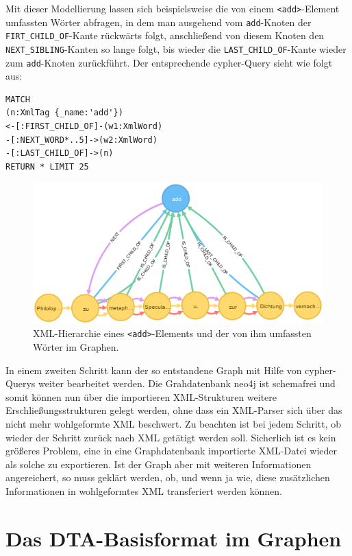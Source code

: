 \documentclass[ngerman,]{scrreprt}
\begin{document}
Mit dieser Modellierung lassen sich beispielsweise die von einem \texttt{\textless{}add\textgreater{}}-Element umfassten Wörter abfragen, in dem man ausgehend vom \texttt{add}-Knoten der \texttt{FIRT\_CHILD\_OF}-Kante rückwärts folgt, anschließend von diesem Knoten den \texttt{NEXT\_SIBLING}-Kanten so lange folgt, bis wieder die \texttt{LAST\_CHILD\_OF}-Kante wieder zum \texttt{add}-Knoten zurückführt. Der entsprechende cypher-Query sieht wie folgt aus:

\begin{verbatim}
MATCH
(n:XmlTag {_name:'add'})
<-[:FIRST_CHILD_OF]-(w1:XmlWord)
-[:NEXT_WORD*..5]->(w2:XmlWord)
-[:LAST_CHILD_OF]->(n)
RETURN * LIMIT 25
\end{verbatim}

\begin{figure}
\centering
\includegraphics{Bilder/TEI2Graph/XML-Hierarchie.png}
\caption{XML-Hierarchie eines \texttt{\textless{}add\textgreater{}}-Elements und der von ihm umfassten Wörter im Graphen.}
\end{figure}

In einem zweiten Schritt kann der so entstandene Graph mit Hilfe von cypher-Querys weiter bearbeitet werden. Die Grahdatenbank neo4j ist schemafrei und somit können nun über die importieren XML-Strukturen weitere Erschließungsstrukturen gelegt werden, ohne dass ein XML-Parser sich über das nicht mehr wohlgeformte XML beschwert. Zu beachten ist bei jedem Schritt, ob wieder der Schritt zurück nach XML getätigt werden soll. Sicherlich ist es kein größeres Problem, eine in eine Graphdatenbank importierte XML-Datei wieder als solche zu exportieren. Ist der Graph aber mit weiteren Informationen angereichert, so muss geklärt werden, ob, und wenn ja wie, diese zusätzlichen Informationen in wohlgeformtes XML transferiert werden können.

\section{Das DTA-Basisformat im Graphen}\label{das-dta-basisformat-im-graphen}
\end{document}
